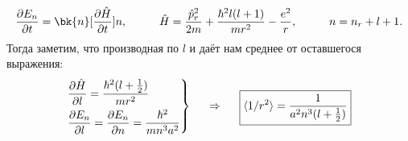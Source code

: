 \begin{equation*}
	\frac{\partial E_n}{\partial t} = \bk{n}[\frac{\partial \hat{H}}{\partial t}]{n},
	\hspace{1 cm}
	\hat{H} = \frac{\hat{p}_r^2}{2 m} + \frac{\hbar^2 l (l+1)}{m r^2} - \frac{e^2}{r},
	\hspace{1 cm}
	n = n_r + l + 1.
\end{equation*}
Тогда заметим, что производная по $l$ и даёт нам среднее от оставшегося выражения:
\begin{equation*}
	\left.
	\begin{aligned}
		&\frac{\partial \hat{H}}{\partial l} = \frac{\hbar^2(l+\tfrac{1}{2})}{m r^2}\\
		&\frac{\partial E_n}{\partial l} = \frac{\partial E_n}{\partial n} = \frac{\hbar^2}{m n^3 a^2}
	\end{aligned}
	\right\}
	\hspace{0.5 cm}
	\Rightarrow
	\hspace{0.5 cm}
	\boxed{\langle 1/r^2\rangle  = \frac{1}{a^2 n^3 (l + \tfrac{1}{2})}}
\end{equation*}

